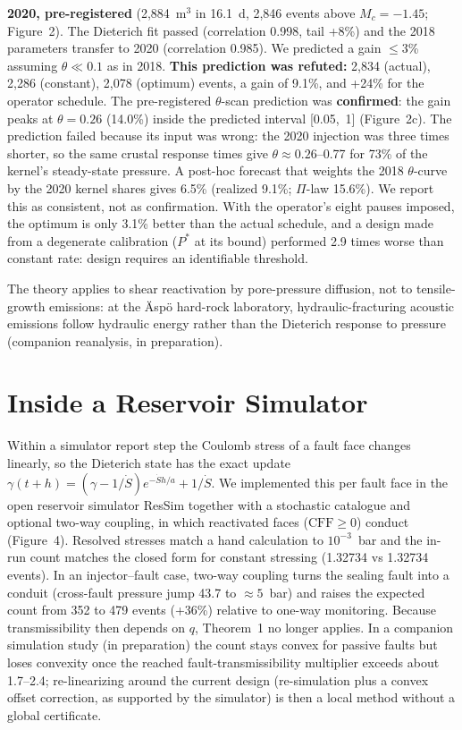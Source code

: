 \documentclass[draft]{agujournal2019}
\begin{document}
\textbf{2020, pre-registered} (2,884~m$^3$ in 16.1~d, 2,846 events above $M_c=-1.45$; Figure~2). The Dieterich fit passed (correlation
0.998, tail +8\%) and the 2018 parameters transfer to 2020 (correlation 0.985). We predicted a gain $\le3$\% assuming $\theta\ll0.1$ as in
2018. \textbf{This prediction was refuted:} 2,834 (actual), 2,286 (constant), 2,078 (optimum) events, a gain of 9.1\%, and +24\% for the
operator schedule. The pre-registered $\theta$-scan prediction was \textbf{confirmed}: the gain peaks at $\theta=0.26$ (14.0\%) inside the
predicted interval [0.05,~1] (Figure~2c). The prediction failed because its input was wrong: the 2020 injection was three times shorter, so
the same crustal response times give $\theta\approx0.26$--0.77 for 73\% of the kernel's steady-state pressure. A post-hoc forecast that
weights the 2018 $\theta$-curve by the 2020 kernel shares gives 6.5\% (realized 9.1\%; $\Pi$-law 15.6\%). We report this as consistent, not
as confirmation. With the operator's eight pauses imposed, the optimum is only 3.1\% better than the actual schedule, and a design made
from a degenerate calibration ($P^*$ at its bound) performed 2.9 times worse than constant rate: design requires an identifiable threshold.

The theory applies to shear reactivation by pore-pressure diffusion, not to tensile-growth emissions: at the \"Asp\"o hard-rock laboratory,
hydraulic-fracturing acoustic emissions follow hydraulic energy rather than the Dieterich response to pressure (companion reanalysis, in preparation).

\section{Inside a Reservoir Simulator}
Within a simulator report step the Coulomb stress of a fault face changes linearly, so the Dieterich state has the exact update
$\gamma(t+h)=(\gamma-1/\dot S)e^{-\dot Sh/a}+1/\dot S$. We implemented this per fault face in the open reservoir simulator ResSim together
with a stochastic catalogue and optional two-way coupling, in which reactivated faces ($\mathrm{CFF}\ge0$) conduct (Figure~4). Resolved
stresses match a hand calculation to $10^{-3}$~bar and the in-run count matches the closed form for constant stressing (1.32734 vs
1.32734 events). In an injector--fault case, two-way coupling turns the sealing fault into a conduit (cross-fault pressure jump 43.7 to
$\approx5$~bar) and raises the expected count from 352 to 479 events (+36\%) relative to one-way monitoring. Because transmissibility then
depends on $q$, Theorem~1 no longer applies. In a companion simulation study (in preparation) the count stays convex for passive faults
but loses convexity once the reached fault-transmissibility multiplier exceeds about 1.7--2.4; re-linearizing around the current design
(re-simulation plus a convex offset correction, as supported by the simulator) is then a local method without a global certificate.
\end{document}
